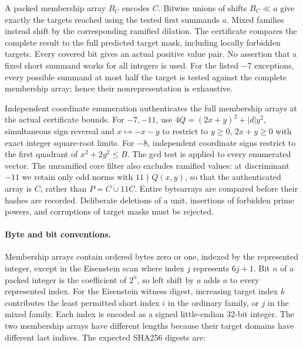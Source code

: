 A packed membership array $B_C$ encodes $C$.  Bitwise unions of shifts
$B_C\ll a$ give exactly the targets reached using the tested first
summands $a$.  Mixed families instead shift by the corresponding
ramified dilation.  The certificate compares the complete result to
the full predicted target mask, including locally forbidden targets.
Every covered bit gives an actual positive value pair.  No assertion
that a fixed short summand works for all integers is used.
For the listed $-7$ exceptions, every possible summand at most half
the target is tested against the complete membership array; hence their
nonrepresentation is exhaustive.

Independent coordinate enumeration authenticates the full membership
arrays at the actual certificate bounds.  For $-7,-11$, use
$4Q=(2x+y)^2+|d|y^2$, simultaneous sign reversal and
$x\mapsto-x-y$ to restrict to $y\ge0$, $2x+y\ge0$ with exact integer
square-root limits.  For $-8$, independent coordinate signs restrict
to the first quadrant of $x^2+2y^2\le B$.
The gcd test is applied to every enumerated vector.  The unramified
core filter also excludes ramified values: at discriminant $-11$ we
retain only odd norms with $11\nmid Q(x,y)$, so that the authenticated
array is $C$, rather than $P=C\mathbin{\dot\cup}11C$.  Entire bytearrays
are compared before their hashes are recorded.  Deliberate deletions
of a unit, insertions of forbidden prime powers, and corruptions of
target masks must be rejected.

\paragraph{Byte and bit conventions.}
Membership arrays contain ordered bytes zero or one, indexed by the
represented integer, except in the Eisenstein scan where index $j$
represents $6j+1$.  Bit $n$ of a packed integer is the coefficient of
$2^n$, so left shift by $a$ adds $a$ to every represented index.
For the Eisenstein witness digest, increasing target index $k$ contributes
the least permitted short index $i$ in the ordinary family, or $j$
in the mixed family.  Each index is encoded as a signed little-endian
32-bit integer.  The two membership arrays have different lengths
because their target domains have different last indices.
The expected SHA256 digests are:

